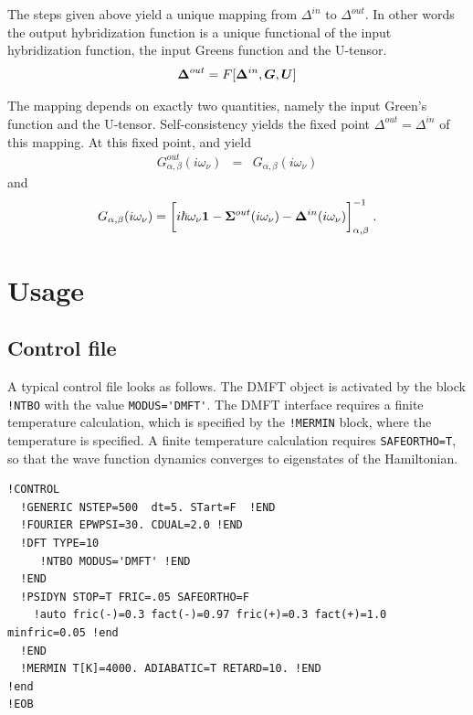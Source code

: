 \documentclass[11pt,a4paper]{report}
\begin{document}
The steps given above yield a unique mapping from $\Delta^{in}$ to
$\Delta^{out}$. In other words the output hybridization function is a
unique functional of the input hybridization function, the input
Greens function and the U-tensor.
\begin{eqnarray}
\bm{\Delta}^{out}=F[\bm{\Delta}^{in},\bm{G},\bm{U}]
\end{eqnarray}


The mapping depends on exactly two quantities, namely
the input Green's function and the U-tensor. Self-consistency yields the 
fixed point $\Delta^{out}=\Delta^{in}$ of this mapping.
At this fixed point,  and  yield
\begin{eqnarray}
G^{out}_{\alpha,\beta}(i\omega_\nu)&=&G_{\alpha,\beta}(i\omega_\nu)
\end{eqnarray}
and 
\begin{eqnarray}
G_{\alpha,\beta}(i\omega_\nu)
=\biggl[
i\hbar\omega_\nu\bm{1}
-\bm{\Sigma}^{out}(i\omega_\nu)
-\bm{\Delta}^{in}(i\omega_\nu)
\biggr]^{-1}_{\alpha,\beta}
\;.
\end{eqnarray}




\section{Usage}
\subsection{Control file}
A typical control file looks as follows. The DMFT object is activated
by the block \verb|!NTBO| with the value \verb|MODUS='DMFT'|. The DMFT
interface requires a finite temperature calculation, which is
specified by the \verb|!MERMIN| block, where the temperature is
specified.  A finite temperature calculation requires
\verb|SAFEORTHO=T|, so that the wave function dynamics converges to
eigenstates of the Hamiltonian.
\begin{verbatim}
!CONTROL
  !GENERIC NSTEP=500  dt=5. STart=F  !END 
  !FOURIER EPWPSI=30. CDUAL=2.0 !END
  !DFT TYPE=10  
     !NTBO MODUS='DMFT' !END   
  !END 
  !PSIDYN STOP=T FRIC=.05 SAFEORTHO=F
    !auto fric(-)=0.3 fact(-)=0.97 fric(+)=0.3 fact(+)=1.0 minfric=0.05 !end
  !END
  !MERMIN T[K]=4000. ADIABATIC=T RETARD=10. !END
!end
!EOB
\end{verbatim}
\end{document}
